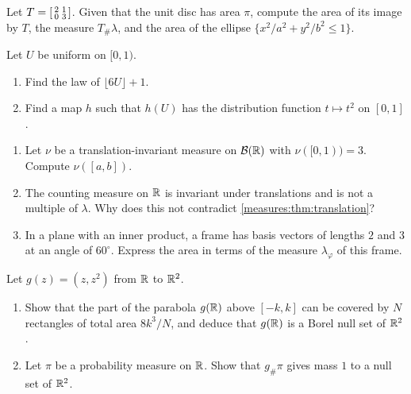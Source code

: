 \begin{notechapter}
\begin{exercise}\label{measures:exr:6}
Let $T = \begin{bsmallmatrix}2 & 1\\ 0 & 3\end{bsmallmatrix}$. Given
that the unit disc has area $\pi$, compute the area of its image by
$T$, the measure $T_\#\lambda$, and the area of the ellipse
$\{x^2/a^2 + y^2/b^2\leq1\}$.
\end{exercise}

\begin{exercise}\label{measures:exr:7}
Let $U$ be uniform on $[0, 1)$.
\begin{enumerate}[nosep]
  \item Find the law of $\lfloor6U\rfloor + 1$.
  \item Find a map $h$ such that $h(U)$ has the distribution function
        $t\mapsto t^2$ on $[0, 1]$.
\end{enumerate}
\end{exercise}

\begin{exercise}\label{measures:exr:8}
\begin{enumerate}[nosep]
  \item Let $\nu$ be a translation-invariant measure on
        $\mathcal B(\mathbb{R})$ with $\nu([0, 1)) = 3$. Compute
        $\nu([a, b])$.
  \item The counting measure on $\mathbb{R}$ is invariant under translations
        and is not a multiple of $\lambda$. Why does this not contradict
        \cref{measures:thm:translation}?
  \item In a plane with an inner product, a frame has basis vectors of
        lengths $2$ and $3$ at an angle of $60^\circ$. Express the
        area in terms of the measure $\lambda_\varphi$ of this frame.
\end{enumerate}
\end{exercise}

\begin{exercise}\label{measures:exr:9}
Let $g(z) = (z, z^2)$ from $\mathbb{R}$ to $\mathbb{R}^2$.
\begin{enumerate}[nosep]
  \item Show that the part of the parabola $g(\mathbb{R})$ above $[-k, k]$ can
        be covered by $N$ rectangles of total area $8k^3/N$, and deduce
        that $g(\mathbb{R})$ is a Borel null set of $\mathbb{R}^2$.
  \item Let $\pi$ be a probability measure on $\mathbb{R}$. Show that
        $g_\#\pi$ gives mass $1$ to a null set of $\mathbb{R}^2$.
\end{enumerate}
\end{exercise}
\end{notechapter}
